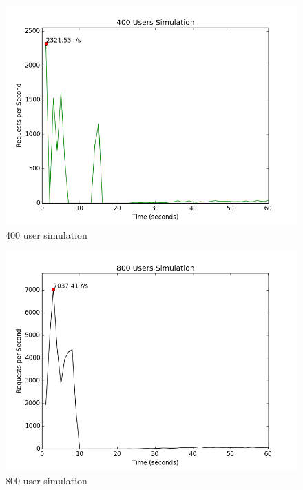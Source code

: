 \documentclass{article}
\begin{document}
\begin{figure}[H]
  \centering
  \includegraphics[scale=0.5]{diagrams/rps-400.png}
  \caption{400 user simulation}
\end{figure}

\begin{figure}[H]
  \centering
  \includegraphics[scale=0.5]{diagrams/rps-800.png}
  \caption{800 user simulation}
\end{figure}
\end{document}
